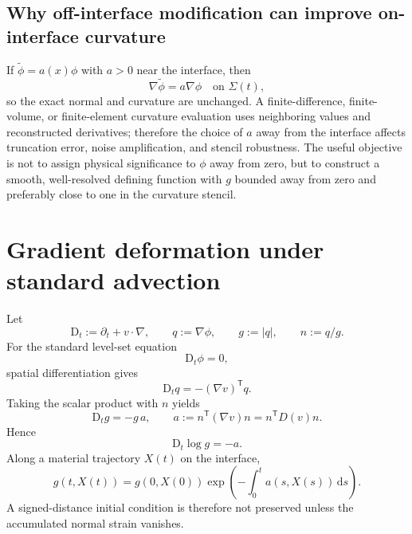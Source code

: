 \documentclass[11pt,a4paper]{article}
\theoremstyle{definition}
\theoremstyle{remark}
\newcommand{\abs}[1]{\left\lvert #1\right\rvert}
\newcommand{\material}{\mathrm{D}_t}
\begin{document}
\subsection{Why off-interface modification can improve on-interface curvature}

If $\widetilde\phi=a(x)\phi$ with $a>0$ near the interface, then
\[
  \nabla\widetilde\phi=a\nabla\phi\quad\text{on }\Sigma(t),
\]
so the exact normal and curvature are unchanged. A finite-difference, finite-volume, or finite-element curvature evaluation uses neighboring values and reconstructed derivatives; therefore the choice of $a$ away from the interface affects truncation error, noise amplification, and stencil robustness. The useful objective is not to assign physical significance to $\phi$ away from zero, but to construct a smooth, well-resolved defining function with $g$ bounded away from zero and preferably close to one in the curvature stencil.

\section{Gradient deformation under standard advection}

Let
\begin{equation}
  \material:=\partial_t+v\cdot\nabla,
  \qquad
  q:=\nabla\phi,
  \qquad
  g:=\abs q,
  \qquad
  n:=q/g.
\end{equation}
For the standard level-set equation
\begin{equation}
  \material\phi=0,
  \label{eq:standard-advection}
\end{equation}
spatial differentiation gives
\begin{equation}
  \material q=-(\nabla v)^{\mathsf T}q.
  \label{eq:q-standard}
\end{equation}
Taking the scalar product with $n$ yields
\begin{equation}
  \material g=-g\,a,
  \qquad
  a:=n^{\mathsf T}(\nabla v)n=n^{\mathsf T}D(v)n.
  \label{eq:g-standard}
\end{equation}
Hence
\begin{equation}
  \material\log g=-a.
  \label{eq:logg-standard}
\end{equation}
Along a material trajectory $X(t)$ on the interface,
\begin{equation}
  g(t,X(t))=g(0,X(0))
  \exp\left(-\int_0^t a(s,X(s))\,\mathrm ds\right).
  \label{eq:g-standard-exact}
\end{equation}
A signed-distance initial condition is therefore not preserved unless the accumulated normal strain vanishes.
\end{document}
